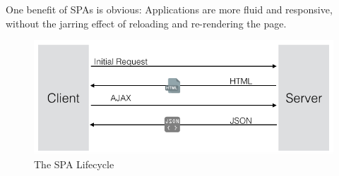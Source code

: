 One benefit of SPAs is obvious: Applications are more fluid and responsive, without the jarring effect of reloading and re-rendering the page.
\begin{figure}[htb]
 \centering
 \includegraphics[width=1.0\linewidth]{images/chapter3/spa_life.png}\hfill
 \caption[SPA Lifecycle]{The SPA Lifecycle}
 \label{fig:spa_lifecycle}
\end{figure}